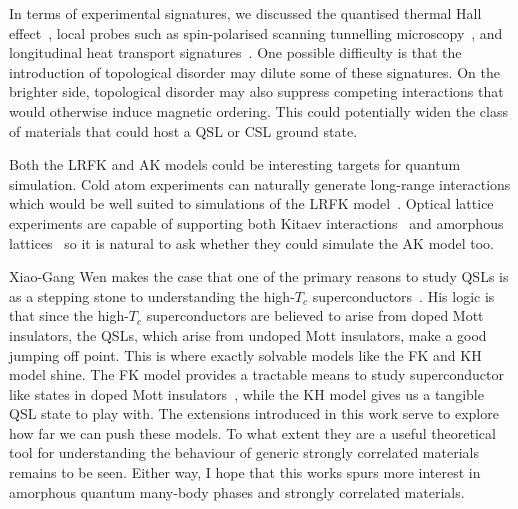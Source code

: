 In terms of experimental signatures, we discussed the quantised thermal Hall effect~\autocite{Kasahara2018,Yokoi2021,Yamashita2020,Bruin2022}, local probes such as spin-polarised scanning tunnelling microscopy~\autocite{Feldmeier2020,Konig2020,Udagawa2021}, and longitudinal heat transport signatures~\autocite{Beenakker2013}. One possible difficulty is that the introduction of topological disorder may dilute some of these signatures. On the brighter side, topological disorder may also suppress competing interactions that would otherwise induce magnetic ordering. This could potentially widen the class of materials that could host a QSL or CSL ground state.

Both the LRFK and AK models could be interesting targets for quantum simulation. Cold atom experiments can naturally generate long-range interactions which would be well suited to simulations of the LRFK model~\autocite{lepersLongrangeInteractionsUltracold2017}. Optical lattice experiments are capable of supporting both Kitaev interactions~\autocite{duanControllingSpinExchange2003,micheliToolboxLatticespinModels2006} and amorphous lattices~\autocite{sadeghiAmorphousTwodimensionalOptical2005} so it is natural to ask whether they could simulate the AK model too.

Xiao-Gang Wen makes the case that one of the primary reasons to study QSLs is as a stepping stone to understanding the high-\(T_c\) superconductors~\autocite{wenQuantumOrdersSymmetric2002}. His logic is that since the high-\(T_c\) superconductors are believed to arise from doped Mott insulators, the QSLs, which arise from undoped Mott insulators, make a good jumping off point. This is where exactly solvable models like the FK and KH model shine. The FK model provides a tractable means to study superconductor like states in doped Mott insulators~\autocite{caiVisualizingEvolutionMott2016}, while the KH model gives us a tangible QSL state to play with. The extensions introduced in this work serve to explore how far we can push these models. To what extent they are a useful theoretical tool for understanding the behaviour of generic strongly correlated materials remains to be seen. Either way, I hope that this works spurs more interest in amorphous quantum many-body phases and strongly correlated materials.
